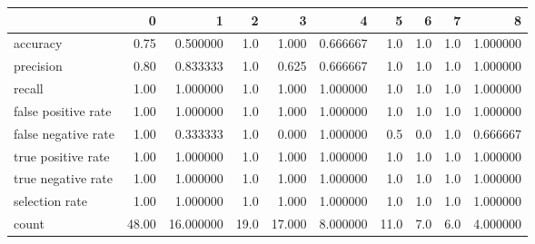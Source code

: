 \begin{tabular}{lrrrrrrrrr}
\toprule
{} &      0 &          1 &     2 &       3 &         4 &     5 &    6 &    7 &         8 \\
\midrule
accuracy            &   0.75 &   0.500000 &   1.0 &   1.000 &  0.666667 &   1.0 &  1.0 &  1.0 &  1.000000 \\
precision           &   0.80 &   0.833333 &   1.0 &   0.625 &  0.666667 &   1.0 &  1.0 &  1.0 &  1.000000 \\
recall              &   1.00 &   1.000000 &   1.0 &   1.000 &  1.000000 &   1.0 &  1.0 &  1.0 &  1.000000 \\
false positive rate &   1.00 &   1.000000 &   1.0 &   1.000 &  1.000000 &   1.0 &  1.0 &  1.0 &  1.000000 \\
false negative rate &   1.00 &   0.333333 &   1.0 &   0.000 &  1.000000 &   0.5 &  0.0 &  1.0 &  0.666667 \\
true positive rate  &   1.00 &   1.000000 &   1.0 &   1.000 &  1.000000 &   1.0 &  1.0 &  1.0 &  1.000000 \\
true negative rate  &   1.00 &   1.000000 &   1.0 &   1.000 &  1.000000 &   1.0 &  1.0 &  1.0 &  1.000000 \\
selection rate      &   1.00 &   1.000000 &   1.0 &   1.000 &  1.000000 &   1.0 &  1.0 &  1.0 &  1.000000 \\
count               &  48.00 &  16.000000 &  19.0 &  17.000 &  8.000000 &  11.0 &  7.0 &  6.0 &  4.000000 \\
\bottomrule
\end{tabular}
